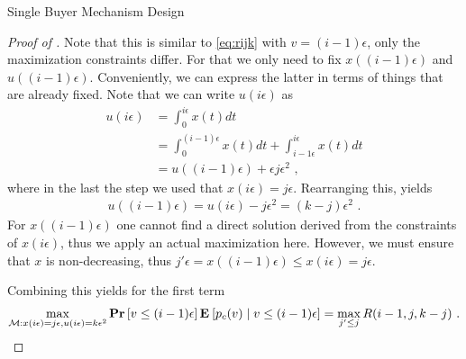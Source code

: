 \documentclass[11pt,a4paper]{article}
\renewcommand{\Pr}[1]{\mbox{\rm\bf Pr}\left[#1\right]}
\newcommand{\Ex}[2][]{\mbox{\rm\bf E}_{#1}\left[#2\right]}
\newcommand{\1}[1]{\mbox{\rm\bf 1}_{#1}}
\newcommand{\eqdot}{\text{ .}}
\newcommand{\eqcomma}{\text{ ,}}
\begin{document}
\begin{section}{Single Buyer Mechanism Design}
\begin{proof}[Proof of ]
     Note that this is similar to \cref{eq:rijk} with $v = (i-1) \epsilon$, only the maximization constraints differ.
     For that we only need to fix $x((i-1)\epsilon)$ and $u((i-1)\epsilon)$.
     Conveniently, we can express the latter in terms of things that are already fixed.
     Note that we can write $u(i\epsilon)$ as
     \begin{align*}
         u(i\epsilon) & = \int_0^{i\epsilon} x(t) dt                                             \\
                      & = \int_0^{(i-1)\epsilon} x(t) dt + \int_{i-1\epsilon}^{i\epsilon} x(t)dt \\
                      & = u((i-1)\epsilon) + \epsilon j \epsilon^2 \eqcomma
     \end{align*}
     where in the last the step we used that $x(i\epsilon) = j\epsilon$.
     Rearranging this, yields
     \begin{align*}
         u((i-1)\epsilon) = u(i\epsilon) - j \epsilon^2 = (k - j) \epsilon^2 \eqdot
     \end{align*}
     For $x((i - 1)\epsilon)$ one cannot find a direct solution derived from the constraints of $x(i\epsilon)$, thus we apply an actual maximization here.
     However, we must ensure that $x$ is non-decreasing, thus $j' \epsilon = x((i-1)\epsilon) \leq x(i\epsilon) = j\epsilon$.

     Combining this yields for the first term
     \begin{align*}
         \max_{\mathcal{M}: x(i\epsilon) = j\epsilon, u(i\epsilon) = k \epsilon^2} \Pr{v \leq (i-1)\epsilon} \Ex{p_c(v) \mid v \leq (i - 1) \epsilon} = \max_{j' \leq j} R(i-1, j, k - j) \eqdot
     \end{align*}


\end{proof}
\end{section}
\end{document}
